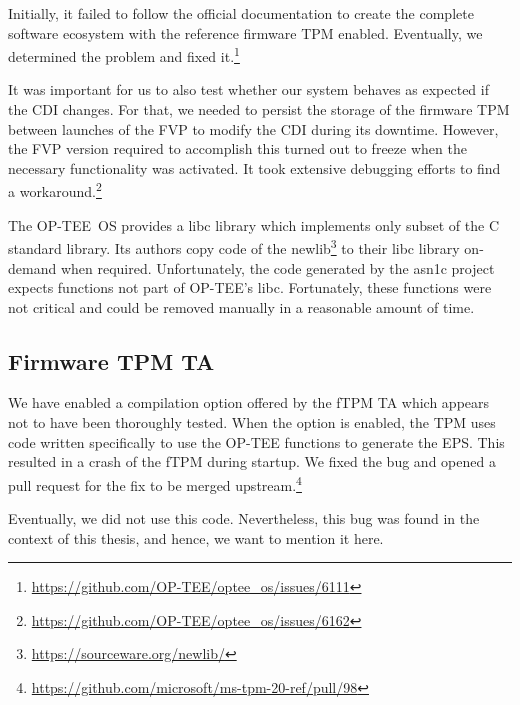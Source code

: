 
Initially, it failed to follow the official documentation to create the complete software ecosystem with the reference firmware TPM enabled.
Eventually, we determined the problem and fixed it.\footnote{\url{https://github.com/OP-TEE/optee_os/issues/6111}}


It was important for us to also test whether our system behaves as expected if the CDI changes.
For that, we needed to persist the storage of the firmware TPM between launches of the FVP to modify the CDI during its downtime.
However, the FVP version required to accomplish this turned out to freeze when the necessary functionality was activated.
It took extensive debugging efforts to find a workaround.\footnote{\url{https://github.com/OP-TEE/optee_os/issues/6162}}

The OP-TEE~OS provides a libc library which implements only subset of the C standard library.
Its authors copy code of the newlib\footnote{\url{https://sourceware.org/newlib/}} to their libc library on-demand when required.
Unfortunately, the code generated by the asn1c project expects functions not part of OP-TEE's libc.
Fortunately, these functions were not critical and could be removed manually in a reasonable amount of time.

\subsection{Firmware TPM TA}

We have enabled a compilation option offered by the fTPM TA which appears not to have been thoroughly tested.
When the option is enabled, the TPM uses code written specifically to use the OP-TEE functions to generate the EPS\@.
This resulted in a crash of the fTPM during startup.
We fixed the bug and opened a pull request for the fix to be merged upstream.\footnote{\url{https://github.com/microsoft/ms-tpm-20-ref/pull/98}}

Eventually, we did not use this code.
Nevertheless, this bug was found in the context of this thesis, and hence, we want to mention it here.
